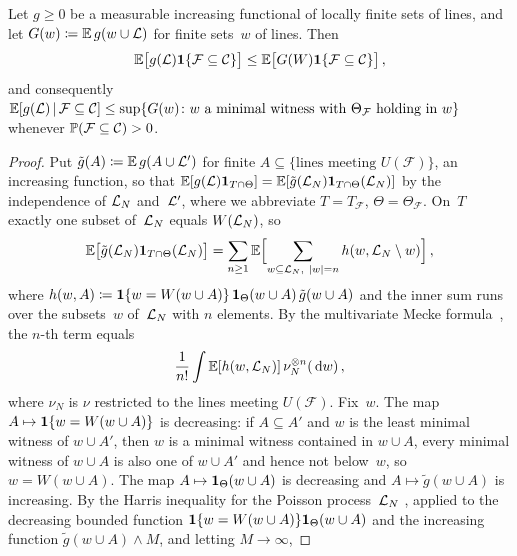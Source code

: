 \documentclass[11pt,letterpaper]{article}
\begin{document}
\begin{lemma}
\label{lem:witness}
Let $g\ge0$ be a measurable increasing functional of locally finite sets of lines, and let $G(w)\coloneqq\E\,g(w\cup\cL)$ for finite sets~$w$ of lines. Then
\begin{equation}
\label{eq:witness}
  \E\bigl[g(\cL)\1\{\mathcal F\subseteq\mathcal C\}\bigr]\le\E\bigl[G(W)\1\{\mathcal F\subseteq\mathcal C\}\bigr]\,,
\end{equation}
and consequently $\E[g(\cL)\,\vert\,\mathcal F\subseteq\mathcal C]\le\sup\{G(w)\colon w\text{ a minimal witness with }\Theta_{\mathcal F}\text{ holding in }w\}$ whenever $\P(\mathcal F\subseteq\mathcal C)>0$.
\end{lemma}

\begin{proof}
Put $\tilde g(A)\coloneqq\E\,g(A\cup\cL')$ for finite $A\subseteq\{\text{lines meeting }U(\mathcal F)\}$, an increasing function, so that $\E[g(\cL)\1_{T\cap\Theta}]=\E[\tilde g(\cL_N)\1_{T\cap\Theta}(\cL_N)]$ by the independence of $\cL_N$ and~$\cL'$, where we abbreviate $T=T_{\mathcal F}$, $\Theta=\Theta_{\mathcal F}$. On~$T$ exactly one subset of~$\cL_N$ equals $W(\cL_N)$, so
\begin{equation*}
  \E\bigl[\tilde g(\cL_N)\1_{T\cap\Theta}(\cL_N)\bigr]=\sum_{n\ge1}\E\Bigl[\sum_{w\subseteq\cL_N,\ \lvert w\rvert=n}h(w,\cL_N\setminus w)\Bigr]\,,
\end{equation*}
where $h(w,A)\coloneqq\1\{w=W(w\cup A)\}\,\1_\Theta(w\cup A)\,\tilde g(w\cup A)$ and the inner sum runs over the subsets~$w$ of~$\cL_N$ with $n$ elements.
By the multivariate Mecke formula~\cite[Theorem~4.4]{LP17}, the $n$-th term equals
\begin{equation*}
  \frac1{n!}\int\E[h(w,\cL_N)]\,\nu_N^{\otimes n}(\dd w)\,,
\end{equation*}
where $\nu_N$ is $\nu$ restricted to the lines meeting $U(\mathcal F)$. Fix~$w$. The map $A\mapsto\1\{w=W(w\cup A)\}$ is decreasing: if $A\subseteq A'$ and $w$ is the least minimal witness of $w\cup A'$, then $w$ is a minimal witness contained in $w\cup A$, every minimal witness of $w\cup A$ is also one of $w\cup A'$ and hence not below~$w$, so $w=W(w\cup A)$. The map $A\mapsto\1_\Theta(w\cup A)$ is decreasing and $A\mapsto\tilde g(w\cup A)$ is increasing. By the Harris inequality for the Poisson process~$\cL_N$ \cite[Theorem~20.4]{LP17}, applied to the decreasing bounded function $\1\{w=W(w\cup A)\}\1_\Theta(w\cup A)$ and the increasing function $\tilde g(w\cup A)\wedge M$, and letting $M\to\infty$,

\end{proof}
\end{document}
